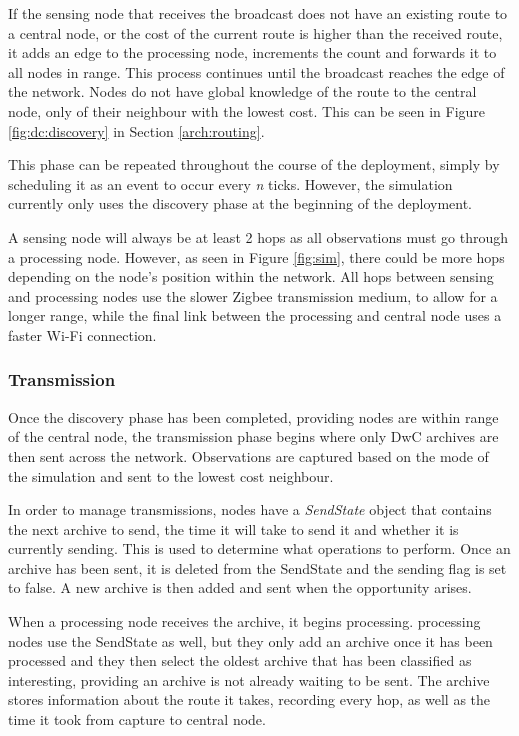 	If the sensing node that receives the broadcast does not have an existing route to a central node, or the cost of the current route is higher than the received route, it adds an edge to the processing node, increments the count and forwards it to all nodes in range. This process continues until the broadcast reaches the edge of the network. Nodes do not have global knowledge of the route to the central node, only of their neighbour with the lowest cost. This can be seen in Figure \ref{fig:dc:discovery} in Section \ref{arch:routing}.
	
	This phase can be repeated throughout the course of the deployment, simply by scheduling it as an event to occur every \textit{n} ticks. However, the simulation currently only uses the discovery phase at the beginning of the deployment.

	A sensing node will always be at least 2 hops as all observations must go through a processing node. However, as seen in Figure \ref{fig:sim}, there could be more hops depending on the node's position within the network. All hops between sensing and processing nodes use the slower Zigbee transmission medium, to allow for a longer range, while the final link between the processing and central node uses a faster Wi-Fi connection.
	
\subsubsection{Transmission}
	Once the discovery phase has been completed, providing nodes are within range of the central node, the transmission phase begins where only DwC archives are then sent across the network. Observations are captured based on the mode of the simulation and sent to the lowest cost neighbour.
	
	In order to manage transmissions, nodes have a \textit{SendState} object that contains the next archive to send, the time it will take to send it and whether it is currently sending. This is used to determine what operations to perform. Once an archive has been sent, it is deleted from the SendState and the sending flag is set to false. A new archive is then added and sent when the opportunity arises.
	
	When a processing node receives the archive, it begins processing. processing nodes use the SendState as well, but they only add an archive once it has been processed and they then select the oldest archive that has been classified as interesting, providing an archive is not already waiting to be sent. The archive stores information about the route it takes, recording every hop, as well as the time it took from capture to central node.
	
